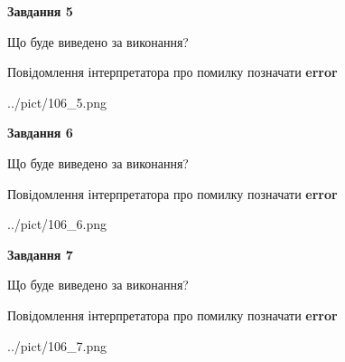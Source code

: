 \documentclass[10pt, ukrainian]{article}
\begin{document}
{\begin {large}
{\begin {center}\textbf{Завдання 5}\end {center}}\par
Що буде виведено за виконання? \par
Повідомлення інтерпретатора про помилку позначати \textbf{error}

\begin{center}
	{../pict/106_5.png}
\end{center}
\newpage

{\begin {center}\textbf{Завдання 6}\end {center}}\par
Що буде виведено за виконання? \par
Повідомлення інтерпретатора про помилку позначати \textbf{error}

\begin{center}
	{../pict/106_6.png}
\end{center}
\newpage

{\begin {center}\textbf{Завдання 7}\end {center}}\par
Що буде виведено за виконання? \par
Повідомлення інтерпретатора про помилку позначати \textbf{error}

\begin{center}
	{../pict/106_7.png}
\end{center}
\newpage

\end {large}}
\end{document}
